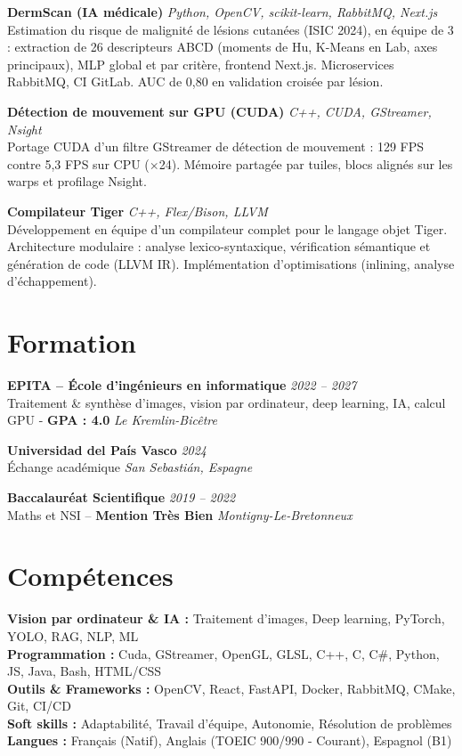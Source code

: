 \documentclass[10pt,a4paper]{article}
\begin{document}
\noindent
\textbf{DermScan (IA médicale)} \hfill \textit{Python, OpenCV, scikit-learn, RabbitMQ, Next.js} \\
Estimation du risque de malignité de lésions cutanées (ISIC 2024), en équipe de 3 : extraction de 26 descripteurs ABCD (moments de Hu, K-Means en Lab, axes principaux), MLP global et par critère, frontend Next.js. Microservices RabbitMQ, CI GitLab. AUC de 0,80 en validation croisée par lésion.


\noindent
\textbf{Détection de mouvement sur GPU (CUDA)} \hfill \textit{C++, CUDA, GStreamer, Nsight} \\
Portage CUDA d'un filtre GStreamer de détection de mouvement : 129 FPS contre 5,3 FPS sur CPU ($\times$24). Mémoire partagée par tuiles, blocs alignés sur les warps et profilage Nsight.


\noindent
\textbf{Compilateur Tiger} \hfill \textit{C++, Flex/Bison, LLVM} \\
Développement en équipe d'un compilateur complet pour le langage objet Tiger. Architecture modulaire : analyse lexico-syntaxique, vérification sémantique et génération de code (LLVM IR). Implémentation d'optimisations (inlining, analyse d'échappement).

\section*{Formation}

\noindent
\textbf{EPITA – École d'ingénieurs en informatique} \hfill \textit{2022 -- 2027} \\
Traitement \& synthèse d’images, vision par ordinateur, deep learning, IA, calcul GPU - \textbf{GPA : 4.0} \hfill \textit{Le Kremlin-Bicêtre}



\noindent
\textbf{Universidad del País Vasco} \hfill \textit{2024} \\
Échange académique \hfill \textit{San Sebastián, Espagne}



\noindent
\textbf{Baccalauréat Scientifique} \hfill \textit{2019 -- 2022} \\
Maths et NSI -- \textbf{Mention Très Bien} \hfill \textit{Montigny-Le-Bretonneux}

\section*{Compétences}
\noindent
\textbf{Vision par ordinateur \& IA :} Traitement d’images, Deep learning, PyTorch, YOLO, RAG, NLP, ML \\
\textbf{Programmation :} Cuda, GStreamer, OpenGL, GLSL, C++, C, C\#, Python, JS, Java, Bash, HTML/CSS \\
\textbf{Outils \& Frameworks :} OpenCV, React, FastAPI, Docker, RabbitMQ, CMake, Git, CI/CD \\
\textbf{Soft skills :} Adaptabilité, Travail d'équipe, Autonomie, Résolution de problèmes \\
\textbf{Langues :} Français (Natif), Anglais (TOEIC 900/990 - Courant), Espagnol (B1)
\end{document}
